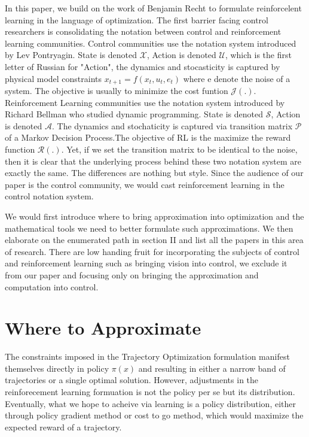\documentclass[journal]{IEEEtran}
\begin{document}
In this paper, we build on the work of Benjamin Recht \cite{Recht2018ATO} to formulate reinforcelent learning in the language of optimization. The first barrier facing control researchers is consolidating the notation between control and reinforcement learning communities. Control communities use the notation system introduced by Lev Pontryagin. State is denoted $ \mathcal{X}$, Action is denoted $\mathcal{U}$, which is the first letter of Russian for "Action", the dynamics and stocasticity is captured by physical model constraints $x_{t+1}=f(x_t,u_t,e_t)$ where e denote the noise of a system. The objective is usually to minimize the cost funtion $\mathcal{J(.)}$. Reinforcement Learning communities use the notation system introduced by Richard Bellman who studied dynamic programming. State is denoted $\mathcal{S}$, Action is denoted $\mathcal{A}$. The dynamics and stochaticity is captured via transition matrix $\mathcal{P}$ of a Markov Decision Process.The objective of RL is the maximize the reward function $\mathcal{R(.)}$. Yet, if we set the transition matrix to be identical to the noise, then it is clear that the underlying process behind these two notation system are exactly the same. The differences are nothing but style. Since the audience of our paper is the control community, we would cast reinforcement learning in the control notation system.

We would first introduce where to bring approximation into optimization and the mathematical tools we need to better formulate such approximations. We then elaborate on the enumerated path in section II and list all the papers in this area of research. There are low handing fruit for incorporating the subjects of control and reinforcement learning such as bringing vision into control, we exclude it from our paper and focusing only on bringing the approximation and computation into control.
\section{Where to Approximate}
The constraints imposed in the Trajectory Optimization formulation manifest themselves directly in policy $\pi(x)$ and resulting in either a narrow band of trajectories or a single optimal solution. However, adjustments in the reinforecement learning formuation is not the policy per se but its distribution. Eventually, what we hope to acheive via learning is a policy distribution, either through policy gradient method or cost to go method, which would maximize the expected reward of a trajectory.
\end{document}
